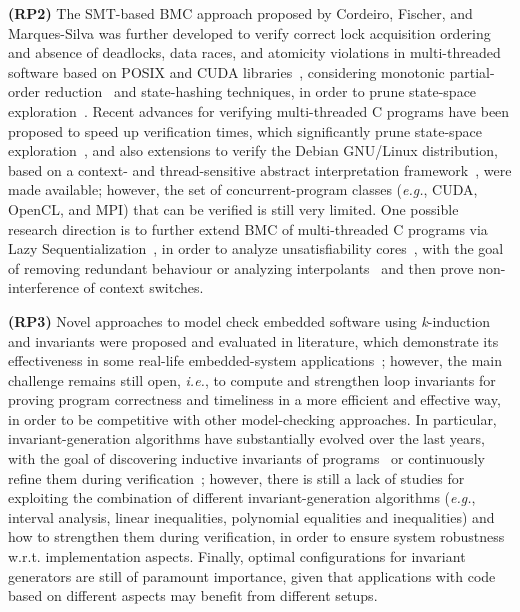 \documentclass[format=acmsmall, review=false, screen=true]{acmart}
\begin{document}
\textbf{(RP2)} The SMT-based BMC approach proposed by Cordeiro, Fischer, and Marques-Silva was further developed to verify correct lock acquisition ordering and absence of deadlocks, data races, and atomicity violations in multi-threaded software based on POSIX and CUDA libraries~\cite{CordeiroF11,Pereira17}, considering monotonic partial-order reduction~\cite{KahlonWG09} and state-hashing techniques, in order to prune state-space exploration~\cite{morse15}. Recent advances for verifying multi-threaded C programs have been proposed to speed up verification times, which significantly prune state-space exploration~\cite{Inverso14,civl15}, and also extensions to verify the Debian GNU/Linux distribution, based on a context- and thread-sensitive abstract interpretation framework~\cite{DBLP:conf/kbse/KroeningPSW16}, were made available; however, the set of concurrent-program classes ({\it e.g.}, CUDA, OpenCL, and MPI) that can be verified is still very limited. One possible research direction is to further extend BMC of multi-threaded C programs via Lazy Sequentialization~\cite{Inverso14}, in order to analyze unsatisfiability cores~\cite{Grumberg05}, with the goal of removing redundant behaviour or analyzing interpolants~\cite{McMillan11} and then prove non-interference of context switches.

\textbf{(RP3)} Novel approaches to model check embedded software using \textit{k}-induction and invariants were proposed and evaluated in literature, which demonstrate its effectiveness in some real-life embedded-system applications~\cite{Gadelha15,Brain15,Rocha15,Donaldson10,Rocha17}; however, the main challenge remains still open, {\it i.e.}, to compute and strengthen loop invariants for proving program correctness and timeliness in a more efficient and effective way, in order to be competitive with other model-checking approaches. In particular, invariant-generation algorithms have substantially evolved over the last years, with the goal of discovering inductive invariants of programs~\cite{pips:2013,Henry:2012} or continuously refine them during verification~\cite{Beyer15}; however, there is still a lack of studies for exploiting the combination of different invariant-generation algorithms ({\it e.g.}, interval analysis, linear inequalities, polynomial equalities and inequalities) and how to strengthen them during verification, in order to ensure system robustness w.r.t. implementation aspects. Finally, optimal configurations for invariant generators are still of paramount importance, given that applications with code based on different aspects may benefit from different setups.
\end{document}
